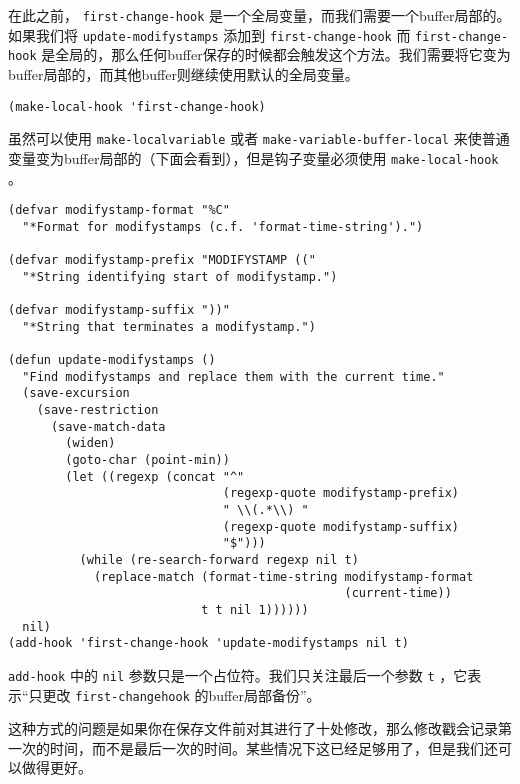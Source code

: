 在此之前， \texttt{first-change-hook} 是一个全局变量，而我们需要一个buffer局部的。如果我们将 \texttt{update-modifystamps} 添加到 \texttt{first-change-hook} 而 \texttt{first-change-hook} 是全局的，那么任何buffer保存的时候都会触发这个方法。我们需要将它变为buffer局部的，而其他buffer则继续使用默认的全局变量。

\begin{verbatim}
(make-local-hook 'first-change-hook)
\end{verbatim}

虽然可以使用 \texttt{make-localvariable} 或者 \texttt{make-variable-buffer-local} 来使普通变量变为buffer局部的（下面会看到），但是钩子变量必须使用 \texttt{make-local-hook} 。

\begin{verbatim}
(defvar modifystamp-format "%C"
  "*Format for modifystamps (c.f. 'format-time-string').")

(defvar modifystamp-prefix "MODIFYSTAMP (("
  "*String identifying start of modifystamp.")

(defvar modifystamp-suffix "))"
  "*String that terminates a modifystamp.")

(defun update-modifystamps ()
  "Find modifystamps and replace them with the current time."
  (save-excursion
    (save-restriction
      (save-match-data
        (widen)
        (goto-char (point-min))
        (let ((regexp (concat "^"
                              (regexp-quote modifystamp-prefix)
                              " \\(.*\\) "
                              (regexp-quote modifystamp-suffix)
                              "$")))
          (while (re-search-forward regexp nil t)
            (replace-match (format-time-string modifystamp-format
                                               (current-time))
                           t t nil 1))))))
  nil)
(add-hook 'first-change-hook 'update-modifystamps nil t)
\end{verbatim}

\texttt{add-hook} 中的 \texttt{nil} 参数只是一个占位符。我们只关注最后一个参数 \texttt{t} ，它表示“只更改 \texttt{first-changehook} 的buffer局部备份”。

这种方式的问题是如果你在保存文件前对其进行了十处修改，那么修改戳会记录第一次的时间，而不是最后一次的时间。某些情况下这已经足够用了，但是我们还可以做得更好。

